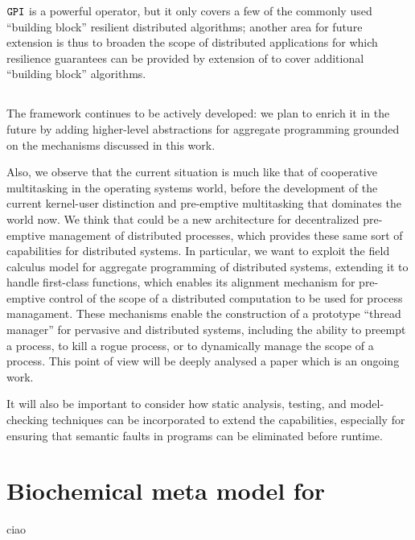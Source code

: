 \documentclass[12pt,a4paper,twoside,openright]{book}
\begin{document}
$\texttt{GPI}$ is a powerful operator, but it only covers a few of the commonly used ``building block'' resilient distributed algorithms; another area for future extension is thus to broaden the scope of distributed applications for which resilience guarantees can be provided by extension of \calculus{} to cover additional ``building block'' algorithms.

\subsection{\protelis{}}

The \protelis{} framework continues to be actively developed: we plan to enrich it in the future by adding higher-level abstractions for aggregate programming grounded on the mechanisms discussed in this work.

Also, we observe that the current situation is much like that of cooperative multitasking in the operating systems world, before the development of the current kernel-user distinction and pre-emptive multitasking that dominates the world now.
%
We think that \protelis{} could be a new architecture for decentralized pre-emptive management of distributed processes, which provides these same sort of capabilities for distributed systems.
%
In particular, we want to exploit the field calculus model for aggregate programming of distributed systems, extending it to handle first-class functions, which enables its alignment mechanism for pre-emptive control of the scope of a distributed computation to be used for process managament.
%
These mechanisms enable the construction of a prototype ``thread manager'' for pervasive and distributed systems, including the ability to preempt a process, to kill a rogue process, or to dynamically manage the scope of a process.
%
This point of view will be deeply analysed a paper which is an ongoing work.

It will also be important to consider how static analysis, testing, and model-checking techniques can be incorporated to extend the capabilities, especially for ensuring that semantic faults in programs can be eliminated before runtime.


\section{Biochemical meta model for \alchemist{}}
ciao
\end{document}
